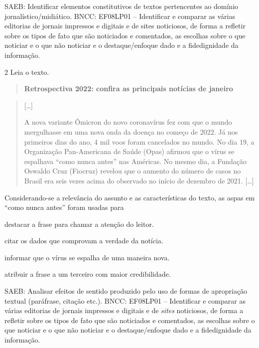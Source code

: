 SAEB: Identificar elementos constitutivos de textos pertencentes ao
domínio jornalístico/midiático. BNCC: EF08LP01 -- Identificar e comparar
as várias editorias de jornais impressos e digitais e de sites
noticiosos, de forma a refletir sobre os tipos de fato que são
noticiados e comentados, as escolhas sobre o que noticiar e o que não
noticiar e o destaque/enfoque dado e a fidedignidade da informação.

\num{2} Leia o texto.

\begin{quote}
\textbf{Retrospectiva 2022: confira as principais notícias de janeiro}
\end{quote}

\begin{quote}
{[}\ldots{]}

A nova variante Ômicron do novo coronavírus fez com que o mundo
mergulhasse em uma nova onda da doença no começo de 2022. Já nos
primeiros dias do ano, 4 mil voos foram cancelados no mundo. No dia 19,
a Organização Pan-Americana de Saúde (Opas) afirmou que o vírus se
espalhava ``como nunca antes'' nas Américas. No mesmo dia, a Fundação
Oswaldo Cruz (Fiocruz) revelou que o aumento do número de casos no
Brasil era seis vezes acima do observado no início de dezembro de 2021.
{[}\ldots{]}
\end{quote}


Considerando-se a relevância do assunto e as características do texto,
as aspas em ``como nunca antes'' foram usadas para

\begin{escolha}

\item destacar a frase para chamar a atenção do leitor. 
\item citar os dados que comprovam a verdade da notícia.
\item informar que o vírus se espalha de uma maneira nova.
\item atribuir a frase a um terceiro com maior credibilidade.
\end{escolha}

SAEB: Analisar efeitos de sentido produzido pelo uso de formas de
apropriação textual (paráfrase, citação etc.). BNCC: EF08LP01 --
Identificar e comparar as várias editorias de jornais impressos e
digitais e de \emph{sites} noticiosos, de forma a refletir sobre os
tipos de fato que são noticiados e comentados, as escolhas sobre o que
noticiar e o que não noticiar e o destaque/enfoque dado e a
fidedignidade da informação.

